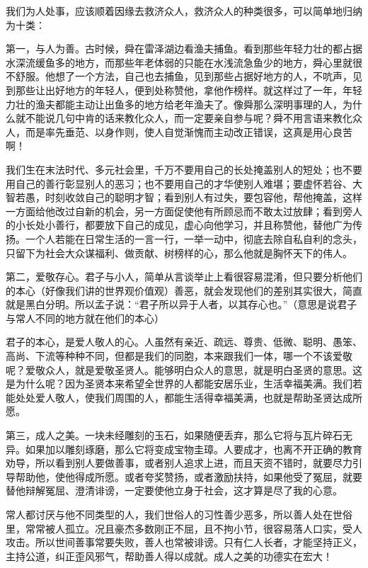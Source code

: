 \documentclass[12pt,UTF8]{ctexbook}
\begin{document}
我们为人处事，应该顺着因缘去救济众人，救济众人的种类很多，可以简单地归纳为十类：

第一，与人为善。古时候，舜在雷泽湖边看渔夫捕鱼。看到那些年轻力壮的都占据水深流缓鱼多的地方，而那些年老体弱的只能在水浅流急鱼少的地方，舜心里就很不舒服。他想了一个方法，自己也去捕鱼，见到那些占据好地方的人，不吭声，见到那些让出好地方的年轻人，便到处称赞他，拿他作榜样。就这样过了一年，年轻力壮的渔夫都能主动让出鱼多的地方给老年渔夫了。像舜那么深明事理的人，为什么就不能说几句中肯的话来教化众人，而一定要亲自参与呢？舜不用言语来教化众人，而是率先垂范、以身作则，使人自觉渐愧而主动改正错误，这真是用心良苦啊！

我们生在末法时代、多元社会里，千万不要用自己的长处掩盖别人的短处；也不要用自己的善行彰显别人的恶习；也不要用自己的才华使别人难堪；要虚怀若谷、大智若愚，时刻收敛自己的聪明才智；看到别人有过失，要包容他，帮他掩盖，这样一方面给他改过自新的机会，另一方面促使他有所顾忌而不敢太过放肆；看到旁人的小长处小善行，都要放下自己的成见，虚心向他学习，并且称赞他，替他广为传扬。一个人若能在日常生活的一言一行，一举一动中，彻底去除自私自利的念头，只留下为社会大众谋福利、做贡献、树榜样的心，那么他就是胸怀天下的伟人。

第二，爱敬存心。君子与小人，简单从言谈举止上看很容易混淆，但只要分析他们的本心（好像我们讲的世界观价值观）善恶，就会发现他们的差别其实很大，简直就是黑白分明。所以孟子说：“君子所以异于人者，以其存心也。”（意思是说君子与常人不同的地方就在他们的本心）

君子的本心，是爱人敬人的心。人虽然有亲近、疏远、尊贵、低微、聪明、愚笨、高尚、下流等种种不同，但都是我们的同胞，本来跟我们一体，哪一个不该爱敬呢？爱敬众人，就是爱敬圣贤人。能够明白众人的意思，就是明白圣贤的意思。这是为什么呢？因为圣贤本来希望全世界的人都能安居乐业，生活幸福美满。我们若能处处爱人敬人，使我们周围的人，都能生活得幸福美满，也就是帮助圣贤达成所愿。

第三，成人之美。一块未经雕刻的玉石，如果随便丢弃，那么它将与瓦片碎石无异。如果加以雕刻琢磨，那么它将变成宝物圭璋。人要成才，也离不开正确的教育劝导，所以看到别人要做善事，或者别人追求上进，而且天资不错时，就要尽力引导帮助他，使他得成所愿。或者夸奖赞扬，或者激励扶持，如果他受了冤屈，就要替他辩解冤屈、澄清诽谤，一定要使他立身于社会，这才算是尽了我的心意。

常人都讨厌与他不同类型的人，我们世俗人的习性善少恶多，所以善人处在世俗里，常常被人孤立。况且豪杰多数刚正不屈，且不拘小节，很容易落人口实，受人攻击。所以世间善事常要失败，善人也常被诽谤。只有仁人长者，才能坚持正义，主持公道，纠正歪风邪气，帮助善人得以成就。成人之美的功德实在宏大！
\end{document}
